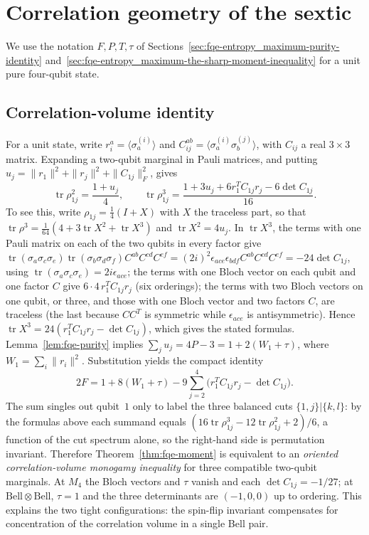 \section{Correlation geometry of the sextic}\label{sec:fqe-correlation}

We use the notation \(F,P,T,\tau\) of Sections~\ref{sec:fqe-entropy_maximum-purity-identity}
and~\ref{sec:fqe-entropy_maximum-the-sharp-moment-inequality} for a unit pure four-qubit state.

\subsection{Correlation-volume identity}\label{sec:fqe-correlation_geometry-correlation-volume-identity}

For a unit state, write \(r_i^a=\langle\sigma_a^{(i)}\rangle\) and
\(C_{ij}^{ab}=\langle\sigma_a^{(i)}\sigma_b^{(j)}\rangle\), with \(C_{ij}\) a real \(3\times3\)
matrix. Expanding a two-qubit marginal in Pauli matrices, and putting
\(u_j=\|r_1\|^2+\|r_j\|^2+\|C_{1j}\|_F^2\), gives \[
\operatorname{tr}\rho_{1j}^2=\frac{1+u_j}{4},\qquad
\operatorname{tr}\rho_{1j}^3=
\frac{1+3u_j+6r_1^TC_{1j}r_j-6\det C_{1j}}{16}.
\] To see this, write \(\rho_{1j}=\tfrac14(I+X)\) with \(X\) the traceless part, so that
\(\operatorname{tr}\rho^3=\tfrac1{64}(4+3\operatorname{tr}X^2+\operatorname{tr}X^3)\) and
\(\operatorname{tr}X^2=4u_j\). In \(\operatorname{tr}X^3\), the terms with one Pauli matrix on each of the two qubits
in every factor give \(\operatorname{tr}(\sigma_a\sigma_c\sigma_e)\operatorname{tr}(\sigma_b\sigma_d\sigma_f)C^{ab}C^{cd}C^{ef}
=(2i)^2\epsilon_{ace}\epsilon_{bdf}C^{ab}C^{cd}C^{ef}=-24\det C_{1j}\), using
\(\operatorname{tr}(\sigma_a\sigma_c\sigma_e)=2i\epsilon_{ace}\); the terms with one Bloch vector on each qubit and one
factor \(C\) give \(6\cdot4\,r_1^TC_{1j}r_j\) (six orderings); the terms with two Bloch vectors on
one qubit, or three, and those with one Bloch vector and two factors \(C\), are traceless (the last because \(CC^T\) is
symmetric while \(\epsilon_{ace}\) is antisymmetric). Hence \(\operatorname{tr}X^3=24(r_1^TC_{1j}r_j-\det C_{1j})\), which gives the stated formulas.
Lemma~\ref{lem:fqe-purity} implies \(\sum_j u_j=4P-3=1+2(W_1+\tau)\), where
\(W_1=\sum_i\|r_i\|^2\). Substitution yields the compact identity \[
\boxed{\quad 2F=
1+8(W_1+\tau)-9\sum_{j=2}^4
\bigl(r_1^TC_{1j}r_j-\det C_{1j}\bigr).\quad} \tag{CV}\label{eq:fqe-correlation-volume}
\] The sum singles out qubit~$1$ only to label the three balanced cuts $\{1,j\}|\{k,l\}$: by the formulas above each
summand equals $(16\operatorname{tr}\rho_{1j}^3-12\operatorname{tr}\rho_{1j}^2+2)/6$, a function of the cut spectrum
alone, so the right-hand side is permutation invariant. Therefore Theorem~\ref{thm:fqe-moment} is equivalent to an
\emph{oriented correlation-volume monogamy inequality} for three compatible two-qubit marginals.
At \(M_4\) the Bloch vectors and \(\tau\) vanish and each \(\det C_{1j}=-1/27\); at
\(\mathrm{Bell}\otimes\mathrm{Bell}\), \(\tau=1\) and the three determinants are \((-1,0,0)\) up to
ordering. This explains the two tight configurations: the spin-flip invariant compensates for
concentration of the correlation volume in a single Bell pair.

